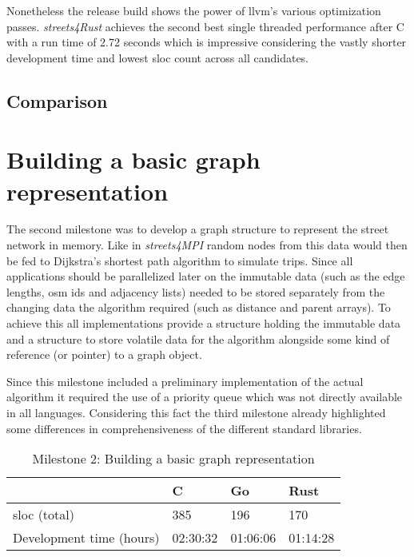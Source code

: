 Nonetheless the release build shows the power of \gls{llvm}'s various optimization passes. \textit{streets4Rust} achieves the second best single threaded performance after C with a run time of 2.72 seconds which is impressive considering the vastly shorter development time and lowest \gls{sloc} count across all candidates.

\subsection{Comparison}
\label{subsec:Implementation::Counting::Comparison}

\section{Building a basic graph representation}
\label{sec:Implementation::Graph_Representation}

The second milestone was to develop a graph structure to represent the street network in memory. Like in \textit{streets4MPI} random nodes from this data would then be fed to Dijkstra's shortest path algorithm to simulate trips. Since all applications should be parallelized later on the immutable data (such as the edge lengths, \gls{osm} ids and adjacency lists) needed to be stored separately from the changing data the algorithm required (such as distance and parent arrays). To achieve this all implementations provide a  structure holding the immutable data and a  structure to store volatile data for the algorithm alongside some kind of reference (or pointer) to a graph object.

Since this milestone included a preliminary implementation of the actual algorithm it required the use of a priority queue which was not directly available in all languages. Considering this fact the third milestone already highlighted some differences in comprehensiveness of the different standard libraries.

\begin{table}[htb]
    \centering
    \begin{tabular}{llll}
        \toprule
            & C
            & Go
            & Rust \\
        \midrule

        \gls{sloc} (total)
            & 385
            & 196
            & 170 \\

        Development time (hours)
            & 02:30:32
            & 01:06:06
            & 01:14:28 \\
        \bottomrule
    \end{tabular}
    \caption{Milestone 2: Building a basic graph representation}
    \label{tb:milestone2}
\end{table}

